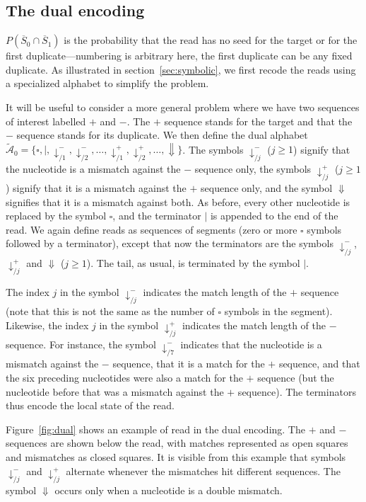 \documentclass{article}
\begin{document}
\subsection{The dual encoding}
\label{sec:dual}

$P(\overline{S}_0 \cap \overline{S}_1)$ is the probability that the read
has no seed for the target or for the first duplicate---numbering is
arbitrary here, the first duplicate can be any fixed duplicate. As
illustrated in section~\ref{sec:symbolic}, we first recode the reads using
a specialized alphabet to simplify the problem.

It will be useful to consider a more general problem where we
have two sequences of interest labelled $+$ and $-$. The $+$ sequence
stands for the target and that the $-$ sequence stands for its duplicate.
We then define the dual alphabet $\tilde{\mathcal{A}}_0 = \{\square, |,
\downarrow_{/1}^-, \downarrow_{/2}^-, \ldots, \downarrow_{/1}^+,
\downarrow_{/2}^+, \ldots, \Downarrow\}$. The symbols $\downarrow_{/j}^-$
($j \geq 1$) signify that the nucleotide is a mismatch against the $-$
sequence only, the symbols $\downarrow_{/j}^+$ ($j \geq 1$) signify that
it is a mismatch against the $+$ sequence only, and the symbol
$\Downarrow$ signifies that it is a mismatch against both. As before,
every other nucleotide is replaced by the symbol $\square$, and the
terminator $|$ is appended to the end of the read. We again define reads
as sequences of segments (zero or more $\square$ symbols followed by a
terminator), except that now the terminators are the symbols
$\downarrow_{/j}^-$, $\downarrow_{/j}^+$ and $\Downarrow$ ($j \geq 1$).
The tail, as usual, is terminated by the symbol $|$.

The index $j$ in the symbol $\downarrow_{/j}^-$ indicates the match length
of the $+$ sequence (note that this is not the same as the number of
$\square$ symbols in the segment). Likewise, the index $j$ in the symbol
$\downarrow_{/j}^+$ indicates the match length of the $-$ sequence. For
instance, the symbol $\downarrow_{/7}^-$ indicates that the nucleotide is
a mismatch against the $-$ sequence, that it is a match for the $+$
sequence, and that the six preceding nucleotides were also a match for the
$+$ sequence (but the nucleotide before that was a mismatch against the
$+$ sequence). The terminators thus encode the local state of the read.

Figure~\ref{fig:dual} shows an example of read in the dual encoding. The
$+$ and $-$ sequences are shown below the read, with matches represented
as open squares and mismatches as closed squares. It is visible from this
example that symbols $\downarrow^-_{/j}$ and $\downarrow^+_{/j}$ alternate
whenever the mismatches hit different sequences. The symbol $\Downarrow$
occurs only when a nucleotide is a double mismatch.
\end{document}
